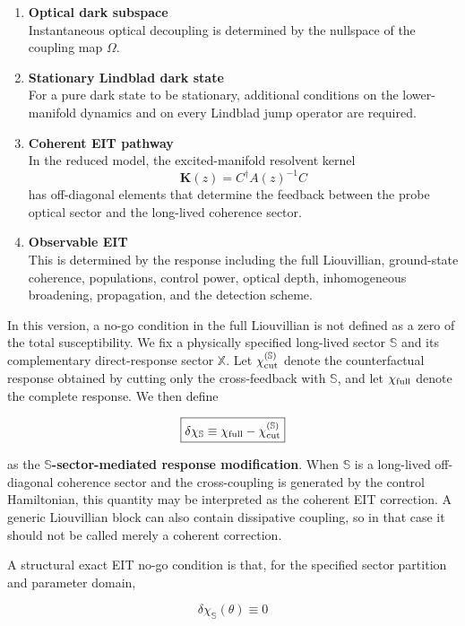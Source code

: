 \documentclass[
  10pt,
  a4paper,
]{article}
\providecommand{\tightlist}{%
  \setlength{\itemsep}{0pt}\setlength{\parskip}{0pt}}
\begin{document}
\begin{enumerate}
\def\labelenumi{\arabic{enumi}.}
\tightlist
\item
  \textbf{Optical dark subspace}\\
  Instantaneous optical decoupling is determined by the nullspace of the
  coupling map \(\Omega\).
\item
  \textbf{Stationary Lindblad dark state}\\
  For a pure dark state to be stationary, additional conditions on the
  lower-manifold dynamics and on every Lindblad jump operator are
  required.
\item
  \textbf{Coherent EIT pathway}\\
  In the reduced model, the excited-manifold resolvent kernel \[
  \mathbf K(z)=C^\dagger A(z)^{-1}C
  \] has off-diagonal elements that determine the feedback between the
  probe optical sector and the long-lived coherence sector.
\item
  \textbf{Observable EIT}\\
  This is determined by the response including the full Liouvillian,
  ground-state coherence, populations, control power, optical depth,
  inhomogeneous broadening, propagation, and the detection scheme.
\end{enumerate}

In this version, a no-go condition in the full Liouvillian is not
defined as a zero of the total susceptibility. We fix a physically
specified long-lived sector \(\mathbb S\) and its complementary
direct-response sector \(\mathbb X\). Let
\(\chi_{\rm cut}^{(\mathbb S)}\) denote the counterfactual response
obtained by cutting only the cross-feedback with \(\mathbb S\), and let
\(\chi_{\rm full}\) denote the complete response. We then define

\[
\boxed{
\delta\chi_{\mathbb S}
\equiv
\chi_{\rm full}-\chi_{\rm cut}^{(\mathbb S)}
}
\]

as the \textbf{\(\mathbb S\)-sector-mediated response modification}.
When \(\mathbb S\) is a long-lived off-diagonal coherence sector and the
cross-coupling is generated by the control Hamiltonian, this quantity
may be interpreted as the coherent EIT correction. A generic Liouvillian
block can also contain dissipative coupling, so in that case it should
not be called merely a coherent correction.

A structural exact EIT no-go condition is that, for the specified sector
partition and parameter domain,

\[
\boxed{
\delta\chi_{\mathbb S}(\theta)\equiv0
}
\]
\end{document}
